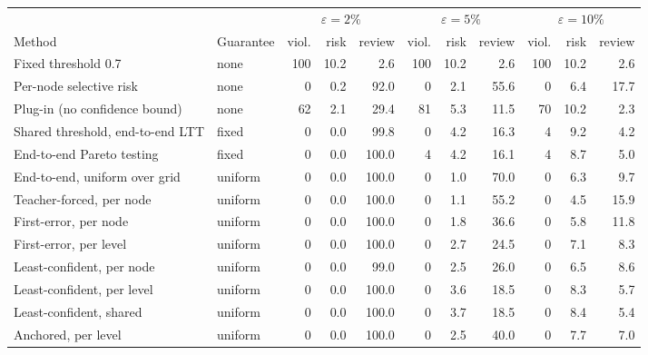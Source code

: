 \begin{tabular}{llrrrrrrrrr}
\toprule
 & & \multicolumn{3}{c}{$\varepsilon=2\%$} & \multicolumn{3}{c}{$\varepsilon=5\%$} & \multicolumn{3}{c}{$\varepsilon=10\%$} \\
\cmidrule(lr){3-5}\cmidrule(lr){6-8}\cmidrule(lr){9-11}
Method & Guarantee & viol. & risk & review & viol. & risk & review & viol. & risk & review \\
\midrule
Fixed threshold 0.7 & none & 100 & 10.2 & 2.6 & 100 & 10.2 & 2.6 & 100 & 10.2 & 2.6 \\
Per-node selective risk & none & 0 & 0.2 & 92.0 & 0 & 2.1 & 55.6 & 0 & 6.4 & 17.7 \\
Plug-in (no confidence bound) & none & 62 & 2.1 & 29.4 & 81 & 5.3 & 11.5 & 70 & 10.2 & 2.3 \\
\midrule
Shared threshold, end-to-end LTT & fixed & 0 & 0.0 & 99.8 & 0 & 4.2 & 16.3 & 4 & 9.2 & 4.2 \\
End-to-end Pareto testing & fixed & 0 & 0.0 & 100.0 & 4 & 4.2 & 16.1 & 4 & 8.7 & 5.0 \\
End-to-end, uniform over grid & uniform & 0 & 0.0 & 100.0 & 0 & 1.0 & 70.0 & 0 & 6.3 & 9.7 \\
\midrule
Teacher-forced, per node & uniform & 0 & 0.0 & 100.0 & 0 & 1.1 & 55.2 & 0 & 4.5 & 15.9 \\
First-error, per node & uniform & 0 & 0.0 & 100.0 & 0 & 1.8 & 36.6 & 0 & 5.8 & 11.8 \\
First-error, per level & uniform & 0 & 0.0 & 100.0 & 0 & 2.7 & 24.5 & 0 & 7.1 & 8.3 \\
\midrule
Least-confident, per node & uniform & 0 & 0.0 & 99.0 & 0 & 2.5 & 26.0 & 0 & 6.5 & 8.6 \\
Least-confident, per level & uniform & 0 & 0.0 & 100.0 & 0 & 3.6 & 18.5 & 0 & 8.3 & 5.7 \\
Least-confident, shared & uniform & 0 & 0.0 & 100.0 & 0 & 3.7 & 18.5 & 0 & 8.4 & 5.4 \\
Anchored, per level & uniform & 0 & 0.0 & 100.0 & 0 & 2.5 & 40.0 & 0 & 7.7 & 7.0 \\
\bottomrule
\end{tabular}
